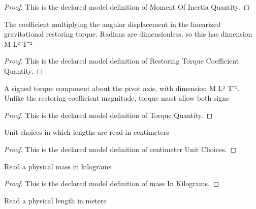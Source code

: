 \begin{proof}
  This is the declared model definition of Moment Of Inertia Quantity.
\end{proof}
\begin{definition}
  \label{def:physics:phyx-mini-0276:phyxminiproblems-problemphyxmini0276-restoringtorquecoefficientquantity}
  The coefficient multiplying the angular displacement in the linearized gravitational restoring torque. Radians are dimensionless, so this has dimension M L² T⁻²
\end{definition}
\begin{proof}
  This is the declared model definition of Restoring Torque Coefficient Quantity.
\end{proof}
\begin{definition}
  \label{def:physics:phyx-mini-0276:phyxminiproblems-problemphyxmini0276-torquequantity}
  A signed torque component about the pivot axis, with dimension M L² T⁻². Unlike the restoring-coefficient magnitude, torque must allow both signs
\end{definition}
\begin{proof}
  This is the declared model definition of Torque Quantity.
\end{proof}
\begin{definition}
  \label{def:physics:phyx-mini-0276:phyxminiproblems-problemphyxmini0276-centimeterunitchoices}
  Unit choices in which lengths are read in centimeters
\end{definition}
\begin{proof}
  This is the declared model definition of centimeter Unit Choices.
\end{proof}
\begin{definition}
  \label{def:physics:phyx-mini-0276:phyxminiproblems-problemphyxmini0276-massinkilograms}
  Read a physical mass in kilograms
\end{definition}
\begin{proof}
  This is the declared model definition of mass In Kilograms.
\end{proof}
\begin{definition}
  \label{def:physics:phyx-mini-0276:phyxminiproblems-problemphyxmini0276-lengthinmeters}
  Read a physical length in meters
\end{definition}
